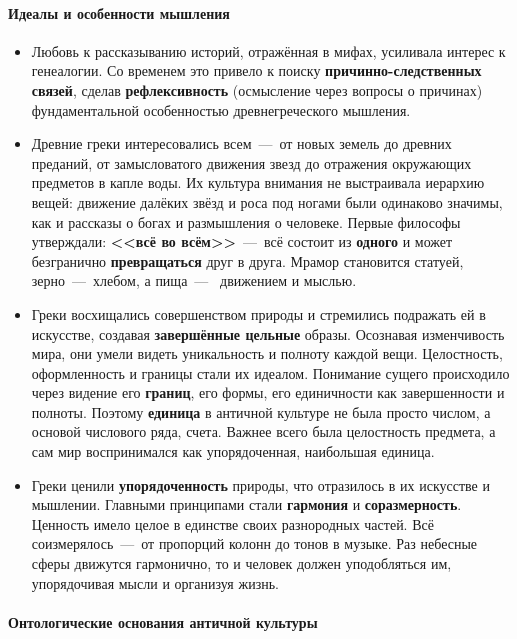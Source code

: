 \paragraph{Идеалы и особенности мышления}

\begin{itemize}
    \item Любовь к рассказыванию историй, отражённая в мифах, усиливала интерес к генеалогии. Со временем это привело к поиску \textbf{причинно-следственных связей}, сделав \textbf{рефлексивность} (осмысление через вопросы о причинах) фундаментальной особенностью древнегреческого мышления.
    \item Древние греки интересовались всем~---~от новых земель до древних преданий, от замысловатого движения звезд до отражения окружающих предметов в капле воды. Их культура внимания не выстраивала иерархию вещей: движение далёких звёзд и роса под ногами были одинаково значимы, как и рассказы о богах и размышления о человеке. Первые философы утверждали: \textbf{<<всё во всём>>}~---~всё состоит из \textbf{одного} и может безгранично \textbf{превращаться} друг в друга. Мрамор становится статуей, зерно~---~хлебом, а пища~---~ движением и мыслью.
    \item Греки восхищались совершенством природы и стремились подражать ей в искусстве, создавая \textbf{завершённые цельные} образы. Осознавая изменчивость мира, они умели видеть уникальность и полноту каждой вещи. Целостность, оформленность и границы стали их идеалом. Понимание сущего происходило через видение его \textbf{границ}, его формы, его единичности как завершенности и полноты. Поэтому \textbf{единица} в античной культуре не была просто числом, а основой числового ряда, счета. Важнее всего была целостность предмета, а сам мир воспринимался как упорядоченная, наибольшая единица.
    \item Греки ценили \textbf{упорядоченность} природы, что отразилось в их искусстве и мышлении. Главными принципами стали \textbf{гармония} и \textbf{соразмерность}. Ценность имело целое в единстве своих разнородных частей. Всё соизмерялось~---~от пропорций колонн до тонов в музыке. Раз небесные сферы движутся гармонично, то и человек должен уподобляться им, упорядочивая мысли и организуя жизнь.
\end{itemize}


\paragraph{Онтологические основания античной культуры}

